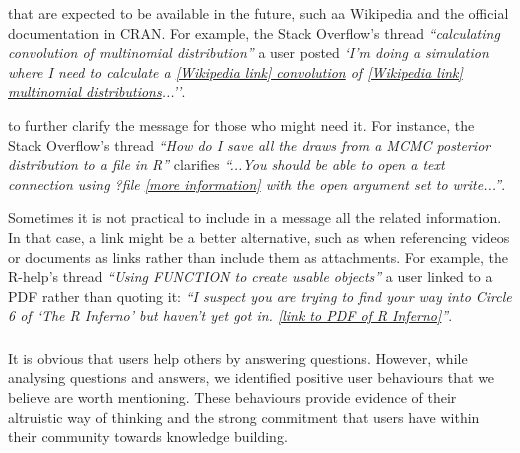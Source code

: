     \begin{description}[itemsep=3pt, topsep=2pt, leftmargin=1em, parsep=0pt]
        \item[Use well maintained websites] that are expected to be available in the future, such aa Wikipedia and the official documentation in CRAN.
        For example, the Stack Overflow's thread \textit{``calculating convolution of multinomial distribution''} a user posted \textit{`I'm doing a simulation
          where I need to calculate a \href{https://en.wikipedia.org/wiki/Convolution_of_probability_distributions}{[Wikipedia link] convolution} of
          \href{https://en.wikipedia.org/wiki/Multinomial_distribution}{[Wikipedia link] multinomial distributions}...''}.

        \item[Use resources that support or expand the message] to further clarify the message for those who might need it.
        For instance, the Stack Overflow's thread \textit{``How do I save all the draws from a MCMC posterior distribution to a file in R''} clarifies \textit{``...You should be able to open a text connection using ?file \href{http://stat.ethz.ch/R-manual/R-devel/library/base/html/connections.html}{[more information]} with the open argument set to write...''}.

        \item[When material relevant to the message is too big.] Sometimes it is not practical to include in a message all the related information. In that
          case, a link might be a better alternative, such as when referencing videos or documents as links rather than include them as attachments.
        For example, the R-help's thread \textit{``Using FUNCTION to create usable objects''} a user linked to a PDF rather than quoting it: \textit{``I suspect you are trying to find your way
          into Circle 6 of `The R Inferno' but haven't yet got in. \href{http://www.burns-stat.com/pages/Tutor/R\_inferno.pdf}{[link to PDF of R Inferno]}''}.
    \end{description}

\subsubsection{\rece}
\label{sec:userbeh}

It is obvious that users help others by answering questions. However, while analysing questions and answers, we identified positive user behaviours that
we believe are worth mentioning.  These behaviours provide evidence of their altruistic way of thinking and the strong commitment that users have within their
community towards knowledge building.

